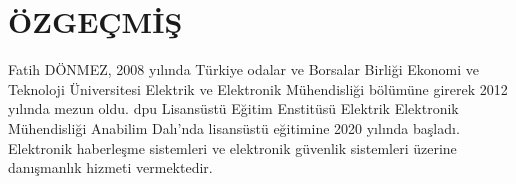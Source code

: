 \chapter*{ÖZGEÇMİŞ}
\thispagestyle{empty}


Fatih DÖNMEZ, 2008 yılında Türkiye odalar ve Borsalar Birliği Ekonomi ve Teknoloji Üniversitesi Elektrik ve Elektronik Mühendisliği bölümüne girerek 2012 yılında mezun oldu. \gls{dpu} Lisansüstü Eğitim Enstitüsü Elektrik Elektronik Mühendisliği Anabilim Dalı'nda lisansüstü eğitimine 2020 yılında başladı. Elektronik haberleşme sistemleri ve elektronik güvenlik sistemleri üzerine danışmanlık hizmeti vermektedir.